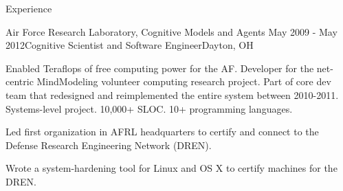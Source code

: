 \begin{rSection}{Experience}
  \begin{rSubsection}{Air Force Research Laboratory, Cognitive Models and Agents}
    {May 2009 - May 2012}{Cognitive Scientist and Software Engineer}{Dayton, OH}
  \item 
    Enabled Teraflops of free computing power for the AF.
    Developer for the net-centric MindModeling volunteer computing research project.
    Part of core dev team that redesigned and reimplemented the entire system between 2010-2011.
    Systems-level project. 10,000+ SLOC. 10+ programming languages. 
  \item
    Led first organization in AFRL headquarters to certify and connect to the Defense Research Engineering Network (DREN).
  \item
    Wrote a system-hardening tool for Linux and OS X to certify machines for the DREN.
  \end{rSubsection}


\end{rSection}
